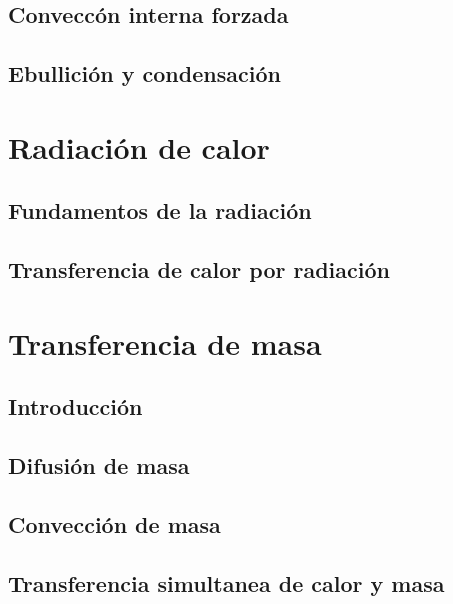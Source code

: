 \documentclass[11pt]{report}
\theoremstyle{plain}
\theoremstyle{definition}
\begin{document}
\section{Conveccón interna forzada}
\section{Ebullición y condensación}


\chapter{Radiación de calor}
\section{Fundamentos de la radiación}
\section{Transferencia de calor por radiación}


\chapter{Transferencia de masa}
\section{Introducción}
\section{Difusión de masa}
\section{Convección de masa}
\section{Transferencia simultanea de calor y masa}


\end{document}
